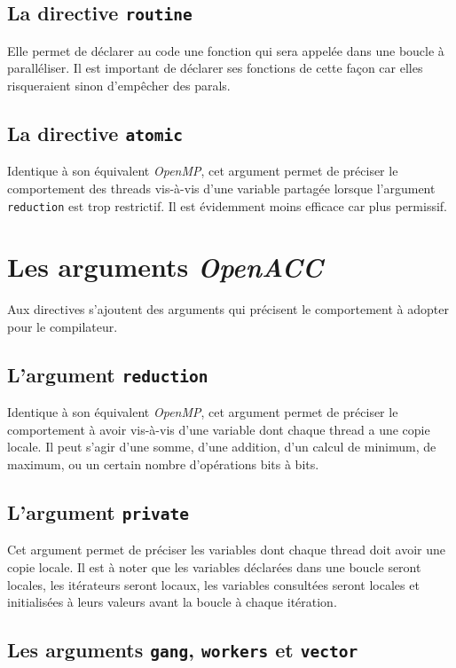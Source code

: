 \documentclass{article}
\begin{document}
\subsection{La directive \texttt{routine}}

Elle permet de déclarer au code une fonction qui sera appelée dans une boucle à paralléliser. Il est important de déclarer ses fonctions de cette façon car elles risqueraient sinon d'empêcher des \gls{paral}s.

\subsection{La directive \texttt{atomic}}

Identique à son équivalent \textit{OpenMP}, cet argument permet de préciser le comportement des threads vis-à-vis d'une variable partagée lorsque l'argument \texttt{reduction} est trop restrictif. Il est évidemment moins efficace car plus permissif.

\section{Les arguments \textit{OpenACC}}

Aux directives s'ajoutent des arguments qui précisent le comportement à adopter pour le compilateur.

\subsection{L'argument \texttt{reduction}}

Identique à son équivalent \textit{OpenMP}, cet argument permet de préciser le comportement à avoir vis-à-vis d'une variable dont chaque thread a une copie locale. Il peut s'agir d'une somme, d'une addition, d'un calcul de minimum, de maximum, ou un certain nombre d'opérations bits à bits.

\subsection{L'argument \texttt{private}}

Cet argument permet de préciser les variables dont chaque thread doit avoir une copie locale. Il est à noter que les variables déclarées dans une boucle seront locales, les itérateurs seront locaux, les variables consultées seront locales et initialisées à leurs valeurs avant la boucle à chaque itération.

\subsection{Les arguments \texttt{gang}, \texttt{workers} et \texttt{vector}}
\end{document}
